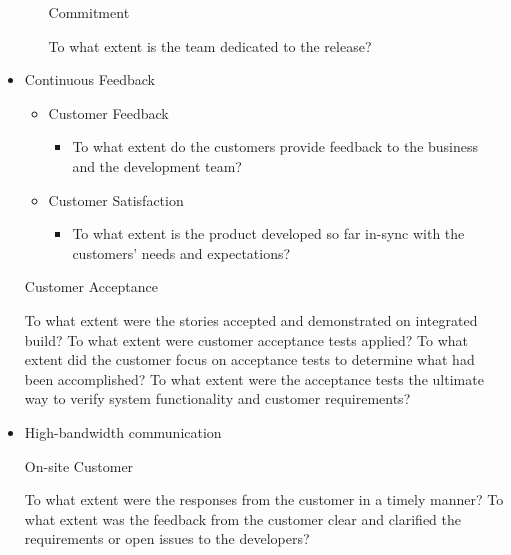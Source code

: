 \begin{appendices}
\begin{itemize}
\begin{itemize}
\begin{itemize}
				\end{itemize}
			\addition Commitment
				\begin{itemize}
					\addition To what extent is the team dedicated to the release?
				\end{itemize}
		\end{itemize}
	\item Continuous Feedback	
		\begin{itemize}
			\item Customer Feedback
				\begin{itemize}
					\item To what extent do the customers provide feedback to the business and the development team?
				\end{itemize}
		\end{itemize}
		\begin{itemize}
			\item Customer Satisfaction
				\begin{itemize}
					\item To what extent is the product developed so far in-sync with the customers' needs and expectations?
				\end{itemize}
		\end{itemize}
		\begin{itemize}
			\addition Customer Acceptance
				\begin{itemize}
					\addition To what extent were the stories accepted and demonstrated on integrated build?
					\addition To what extent were customer acceptance tests applied?
					\addition To what extent did the customer focus on acceptance tests to determine what had been accomplished?
					\addition To what extent were the acceptance tests the ultimate way to verify system functionality and customer requirements?
				\end{itemize}
		\end{itemize}
	\item High-bandwidth communication
		\begin{itemize}
			\addition On-site Customer
				\begin{itemize}
					\addition To what extent were the responses from the customer in a timely manner?
					\addition To what extent was the feedback from the customer clear and clarified the requirements or open issues to the developers?
				\end{itemize}

\end{itemize}
\end{itemize}
\end{appendices}
